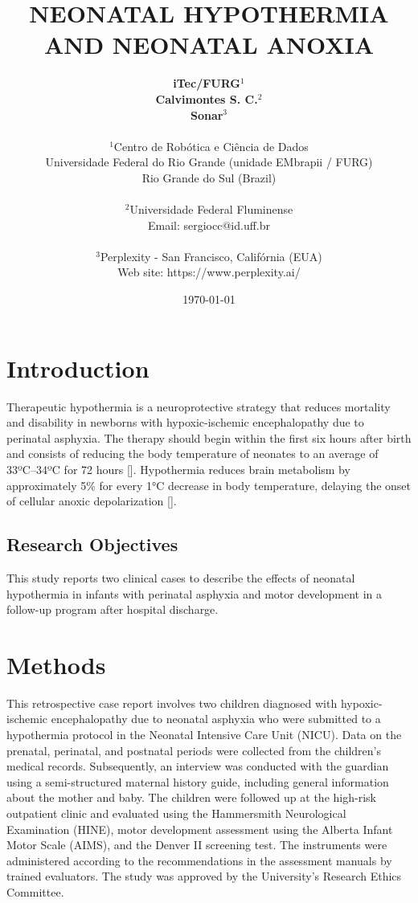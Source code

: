 \documentclass[11pt,a4paper]{article}
\title{\textbf{NEONATAL HYPOTHERMIA AND NEONATAL ANOXIA}}
\author{
	\textbf{iTec/FURG}$^{1}$ \\
	\textbf{Calvimontes S. C.}$^{2}$ \\
	\textbf{Sonar}$^{3}$ \\
	\\
	\small $^{1}$Centro de Robótica e Ciência de Dados \\
	\small Universidade Federal do Rio Grande (unidade EMbrapii / FURG) \\
	\small Rio Grande do Sul (Brazil) \\
	\\
	\small $^{2}$Universidade Federal Fluminense \\
	\small Email: sergiocc@id.uff.br \\
	\\
	\small $^{3}$Perplexity - San Francisco, Califórnia (EUA) \\
	\small Web site: https://www.perplexity.ai/
}
\date{\today}
\begin{document}
	
	\maketitle
	
	\newpage
	
	\section{Introduction}
	Therapeutic hypothermia is a neuroprotective strategy that reduces mortality and disability in newborns with hypoxic-ischemic encephalopathy due to perinatal asphyxia. The therapy should begin within the first six hours after birth and consists of reducing the body temperature of neonates to an average of 33ºC–34ºC for 72 hours [\cite{Azzopardi2014,Thayyil2021,Abate2021}]. Hypothermia reduces brain metabolism by approximately 5\% for every 1°C decrease in body temperature, delaying the onset of cellular anoxic depolarization [\cite{Silveira2015}].
		
	\subsection{Research Objectives}
	This study reports two clinical cases to describe the effects of neonatal hypothermia in infants with perinatal asphyxia and motor development in a follow-up program after hospital discharge.
	
	\section{Methods}
	This retrospective case report involves two children diagnosed with hypoxic-ischemic encephalopathy due to neonatal asphyxia who were submitted to a hypothermia protocol in the Neonatal Intensive Care Unit (NICU). Data on the prenatal, perinatal, and postnatal periods were collected from the children’s medical records. Subsequently, an interview was conducted with the guardian using a semi-structured maternal history guide, including general information about the mother and baby. The children were followed up at the high-risk outpatient clinic and evaluated using the Hammersmith Neurological Examination (HINE), motor development assessment using the Alberta Infant Motor Scale (AIMS), and the Denver II screening test. The instruments were administered according to the recommendations in the assessment manuals by trained evaluators. The study was approved by the University’s Research Ethics Committee.
	
\end{document}
